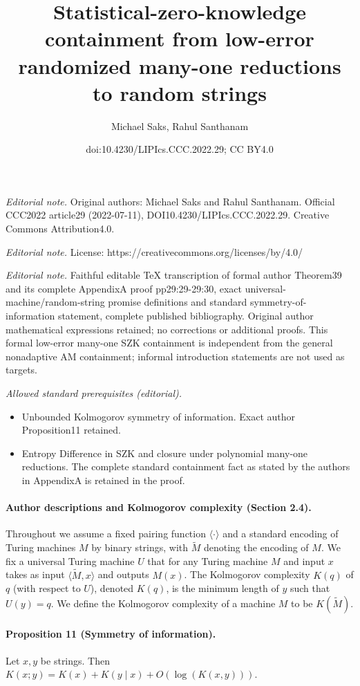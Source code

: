 \documentclass[10pt,a4paper]{article}
\title{Statistical-zero-knowledge containment from low-error randomized many-one reductions to random strings}
\author{Michael Saks, Rahul Santhanam}
\date{doi:10.4230/LIPIcs.CCC.2022.29; CC BY4.0}
\begin{document}
\maketitle
\noindent\textit{Editorial note.} Original authors: Michael Saks and Rahul Santhanam. Official CCC2022 article29 (2022-07-11), DOI10.4230/LIPIcs.CCC.2022.29. Creative Commons Attribution4.0.\par\medskip
\noindent\textit{Editorial note.} License: https://creativecommons.org/licenses/by/4.0/\par\medskip
\noindent\textit{Editorial note.} Faithful editable TeX transcription of formal author Theorem39 and its complete AppendixA proof pp29:29-29:30, exact universal-machine/random-string promise definitions and standard symmetry-of-information statement, complete published bibliography. Original author mathematical expressions retained; no corrections or additional proofs. This formal low-error many-one SZK containment is independent from the general nonadaptive AM containment; informal introduction statements are not used as targets.\par\medskip
\noindent\textit{Allowed standard prerequisites (editorial).}\begin{itemize}
\item Unbounded Kolmogorov symmetry of information. Exact author Proposition11 retained.
\item Entropy Difference in SZK and closure under polynomial many-one reductions. The complete standard containment fact as stated by the authors in AppendixA is retained in the proof.
\end{itemize}\medskip
\paragraph{Author descriptions and Kolmogorov complexity (Section 2.4).}
Throughout we assume a fixed pairing function $\langle\cdot\rangle$ and a standard encoding of Turing machines $M$ by binary strings, with $\widetilde M$ denoting the encoding of $M$.
We fix a universal Turing machine $U$ that for any Turing machine $M$ and input $x$ takes as input $\langle\widetilde M,x\rangle$ and outputs $M(x)$. The Kolmogorov complexity $K(q)$ of $q$ (with respect to $U$), denoted $K(q)$, is the minimum length of $y$ such that $U(y)=q$. We define the Kolmogorov complexity of a machine $M$ to be $K(\widetilde M)$.
\paragraph{Proposition 11 (Symmetry of information).}
Let $x,y$ be strings. Then $K(x;y)=K(x)+K(y\mid x)+O(\log(K(x,y)))$.
\end{document}
